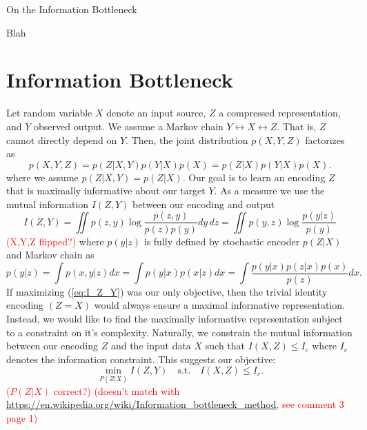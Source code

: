 \documentclass[11pt]{article}
\newcommand\myworries[1]{\textcolor{red}{(#1)}}
\begin{document}
\begin{center}
{\LARGE On the Information Bottleneck} 
\end{center}

Blah

\section{Information Bottleneck}


Let random variable $X$ denote an input source, $Z$ a compressed representation, and $Y$ observed output. We assume a Markov chain $Y \leftrightarrow X \leftrightarrow Z$. That is, $Z$ cannot directly depend on $Y$. Then, the joint distribution $p(X,Y,Z)$ factorizes as
\begin{equation}
p(X, Y, Z) = p(Z\vert X,Y)p(Y\vert X)p(X) = p(Z\vert X)p(Y\vert X)p(X).
\end{equation}
where we assume $p(Z\vert X,Y) = p(Z\vert X)$.
Our goal is to learn an encoding $Z$ that is maximally informative about our target $Y$. As a measure we use the mutual information $I(Z,Y)$ between our encoding and output
\begin{equation}
I(Z,Y) = \iint p(z,y) \log \frac{p(z,y)}{p(z)p(y)} dy\, dz = \iint p(y,z) \log \frac{p(y\vert z)}{p(y)}
\label{eq:I_Z_Y}
\end{equation}
\myworries{X,Y,Z flipped?}
where  $p(y\vert z)$ is fully defined by stochastic encoder $p(Z\vert X)$ and Markov chain as
\begin{equation}
p(y\vert z) = \int p(x,y\vert z) dx = \int p(y \vert x) p(x \vert z) dx = \int \frac{p(y \vert x)p(z \vert x) p(x)}{p(z)}dx.
\label{eq:p_y_z}
\end{equation}
If maximizing (\ref{eq:I_Z_Y}) was our only objective, then the trivial identity encoding $(Z = X)$ would always ensure a maximal informative representation. Instead, we would like to find the maximally informative representation subject to a constraint on it's complexity. Naturally, we constrain the mutual information between our encoding $Z$ and the input data $X$ such that $I(X,Z) \leq I_c$ where $I_c$ denotes the information constraint. This suggests our objective:
\begin{equation}
\underset{P(Z\vert X)}{\min} I(Z,Y) \quad\text{s.t.}\quad I(X,Z) \leq I_c.
\end{equation}
\myworries{$P(Z\vert X)$ correct?}
\myworries{doesn't match with \url{https://en.wikipedia.org/wiki/Information_bottleneck_method}, see comment 3 page 1}
\end{document}
